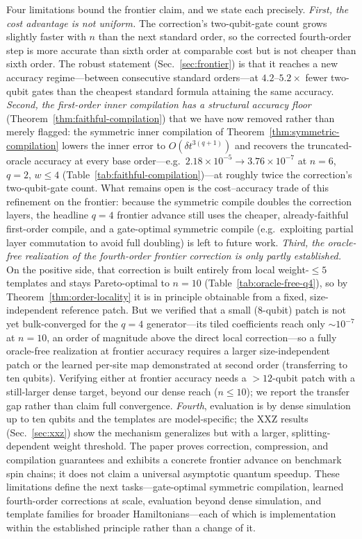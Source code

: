 \documentclass[aps,prresearch,reprint,superscriptaddress,nofootinbib,amsmath,amssymb]{revtex4-2}
\newcommand{\dt}{\delta t}
\begin{document}
Four limitations bound the frontier claim, and we state each precisely. \emph{First, the cost advantage is not uniform.} The correction's two-qubit-gate count grows slightly faster with $n$ than the next standard order, so the corrected fourth-order step is more accurate than sixth order at comparable cost but is not cheaper than sixth order. The robust statement (Sec.~\ref{sec:frontier}) is that it reaches a new accuracy regime---between consecutive standard orders---at $4.2$--$5.2\times$ fewer two-qubit gates than the cheapest standard formula attaining the same accuracy. \emph{Second, the first-order inner compilation has a structural accuracy floor} (Theorem~\ref{thm:faithful-compilation}) that we have now removed rather than merely flagged: the symmetric inner compilation of Theorem~\ref{thm:symmetric-compilation} lowers the inner error to $O(\dt^{3(q+1)})$ and recovers the truncated-oracle accuracy at every base order---e.g.\ $2.18\times10^{-5}\!\to\!3.76\times10^{-7}$ at $n=6$, $q=2$, $w\le4$ (Table~\ref{tab:faithful-compilation})---at roughly twice the correction's two-qubit-gate count. What remains open is the cost--accuracy trade of this refinement on the frontier: because the symmetric compile doubles the correction layers, the headline $q=4$ frontier advance still uses the cheaper, already-faithful first-order compile, and a gate-optimal symmetric compile (e.g.\ exploiting partial layer commutation to avoid full doubling) is left to future work. \emph{Third, the oracle-free realization of the fourth-order frontier correction is only partly established.} On the positive side, that correction is built entirely from local weight-$\leq5$ templates and stays Pareto-optimal to $n=10$ (Table~\ref{tab:oracle-free-q4}), so by Theorem~\ref{thm:order-locality} it is in principle obtainable from a fixed, size-independent reference patch. But we verified that a small ($8$-qubit) patch is not yet bulk-converged for the $q=4$ generator---its tiled coefficients reach only $\sim10^{-7}$ at $n=10$, an order of magnitude above the direct local correction---so a fully oracle-free realization at frontier accuracy requires a larger size-independent patch or the learned per-site map demonstrated at second order (transferring to ten qubits). Verifying either at frontier accuracy needs a ${>}12$-qubit patch with a still-larger dense target, beyond our dense reach ($n\le10$); we report the transfer gap rather than claim full convergence. \emph{Fourth}, evaluation is by dense simulation up to ten qubits and the templates are model-specific; the XXZ results (Sec.~\ref{sec:xxz}) show the mechanism generalizes but with a larger, splitting-dependent weight threshold. The paper proves correction, compression, and compilation guarantees and exhibits a concrete frontier advance on benchmark spin chains; it does not claim a universal asymptotic quantum speedup. These limitations define the next tasks---gate-optimal symmetric compilation, learned fourth-order corrections at scale, evaluation beyond dense simulation, and template families for broader Hamiltonians---each of which is implementation within the established principle rather than a change of it.
\end{document}
